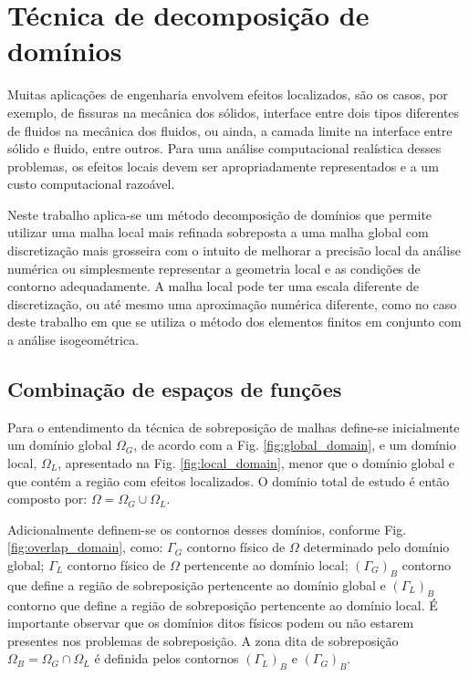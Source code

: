\documentclass[tese_patricia]{subfiles}
\begin{document}
\chapter[Técnica de decomposição de domínios]{Técnica de decomposição de domínios} \label{capitulo:Cap4}

Muitas aplicações de engenharia envolvem efeitos localizados, são os casos, por exemplo, de fissuras na mecânica dos sólidos, interface entre dois tipos diferentes de fluidos na mecânica dos fluidos, ou ainda, a camada limite na interface entre sólido e fluido, entre outros. Para uma análise computacional realística desses problemas, os efeitos locais devem ser apropriadamente representados e a um custo computacional razoável. 

Neste trabalho aplica-se um método decomposição de domínios que permite utilizar uma malha local mais refinada sobreposta a uma malha global com discretização mais grosseira com o intuito de melhorar a precisão local da análise numérica ou simplesmente representar a geometria local e as condições de contorno adequadamente. A malha local pode ter uma escala diferente de discretização, ou até mesmo uma aproximação numérica diferente, como no caso deste trabalho em que se utiliza o método dos elementos finitos em conjunto com a análise isogeométrica.

\section{Combinação de espaços de funções}

Para o entendimento da técnica de sobreposição de malhas define-se inicialmente um dom\'inio global $\Omega_G$, de acordo com a Fig. \ref{fig:global_domain}, e um dom\'inio local, $\Omega_L$, apresentado na Fig. \ref{fig:local_domain}, menor que o dom\'inio global e que cont\'em a regi\~ao com efeitos localizados. O dom\'inio total de estudo \'e ent\~ao composto por: $\Omega = \Omega_G \cup \Omega_L$.

Adicionalmente definem-se os contornos desses dom\'inios, conforme Fig. \ref{fig:overlap_domain}, como: $\Gamma_{G}$ contorno f\'isico de $\Omega$ determinado pelo dom\'inio global; $\Gamma_{L}$ contorno f\'isico de $\Omega$ pertencente ao dom\'inio local; $(\Gamma_{G})_{B}$ contorno que define a regi\~ao de sobreposi\c{c}\~ao pertencente ao dom\'inio global e $(\Gamma_{L})_{B}$ contorno que define a regi\~ao de sobreposi\c{c}\~ao pertencente ao dom\'inio local. \'E importante observar que os dom\'inios ditos f\'isicos podem ou n\~ao estarem presentes nos problemas de sobreposi\c{c}\~ao. A zona dita de sobreposi\c{c}\~ao $\Omega_{B} = \Omega_G \cap \Omega_L$ \'e definida pelos contornos $(\Gamma_{L})_{B}$ e $(\Gamma_{G})_{B}$.
\end{document}
